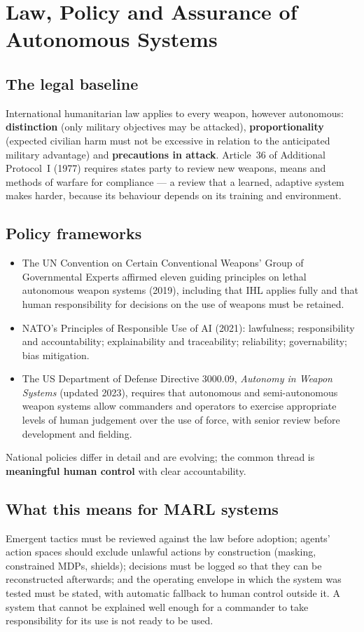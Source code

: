 \documentclass[11pt]{article}
\begin{document}
\section{Law, Policy and Assurance of Autonomous Systems}
\subsection{The legal baseline}
International humanitarian law applies to every weapon, however autonomous: \textbf{distinction} (only military objectives may be attacked), \textbf{proportionality} (expected civilian harm must not be excessive in relation to the anticipated military advantage) and \textbf{precautions in attack}. Article~36 of Additional Protocol~I (1977) requires states party to review new weapons, means and methods of warfare for compliance --- a review that a learned, adaptive system makes harder, because its behaviour depends on its training and environment.
\subsection{Policy frameworks}
\begin{itemize}
\item The UN Convention on Certain Conventional Weapons' Group of Governmental Experts affirmed eleven guiding principles on lethal autonomous weapon systems (2019), including that IHL applies fully and that human responsibility for decisions on the use of weapons must be retained.
\item NATO's Principles of Responsible Use of AI (2021): lawfulness; responsibility and accountability; explainability and traceability; reliability; governability; bias mitigation.
\item The US Department of Defense Directive 3000.09, \emph{Autonomy in Weapon Systems} (updated 2023), requires that autonomous and semi-autonomous weapon systems allow commanders and operators to exercise appropriate levels of human judgement over the use of force, with senior review before development and fielding.
\end{itemize}
National policies differ in detail and are evolving; the common thread is \textbf{meaningful human control} with clear accountability.
\subsection{What this means for MARL systems}
Emergent tactics must be reviewed against the law before adoption; agents' action spaces should exclude unlawful actions by construction (masking, constrained MDPs, shields); decisions must be logged so that they can be reconstructed afterwards; and the operating envelope in which the system was tested must be stated, with automatic fallback to human control outside it. A system that cannot be explained well enough for a commander to take responsibility for its use is not ready to be used.
\end{document}
